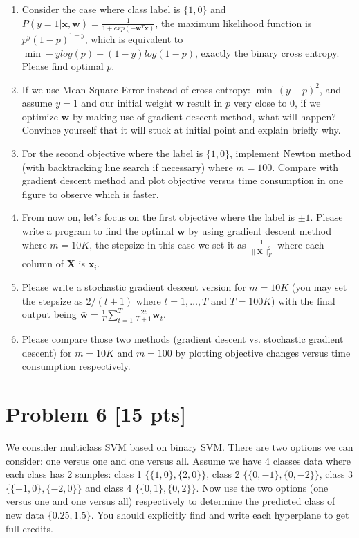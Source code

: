 \documentclass[11pt]{article}
\newcommand{\mtx}[1]{\mathbf{#1}}
\newcommand{\vct}[1]{\mathbf{#1}}
\def \mX {\mtx{X}}
\def \vw {\vct{w}}
\def \vx {\vct{x}}
\begin{document}
\begin{enumerate}
\begin{enumerate}
	\end{enumerate}
	\item Consider the case where class label is $\{1,0\}$ and $P(y=1|\vx,\vw)=\frac{1}{1+exp(-\vw^T\vx)}$, the maximum likelihood function is $p^y(1-p)^{1-y}$, which is equivalent to $\min -ylog(p)-(1-y)log(1-p)$, exactly the binary cross entropy. Please find optimal $p$.
	\item If we use Mean Square Error instead of cross entropy: $\min \ (y-p)^2$, and assume $y=1$ and our initial weight $\vw$ result in $p$ very close to 0, if we optimize $\vw$ by making use of gradient descent method, what will happen? Convince yourself that it will stuck at initial point and explain briefly why.
	\item For the second objective where the label is $\{1,0\}$, implement Newton method (with backtracking line search if necessary) where $m=100$.  Compare with gradient descent method and plot objective versus time consumption in one figure to observe which is faster.
	\item From now on, let's focus on the first objective where the label is $\pm1$. Please write a program to find the optimal  $\vw$ by using gradient descent method where $m=10K$, the stepsize in this case we set it as $\frac{1}{\|\mX\|_F^2}$ where each column of $\mX$ is $\vx_i$.
	\item Please write a stochastic gradient descent version for $m=10K$ (you may set the stepsize as $2/(t+1)$ where $t=1,\dots,T$ and $T=100K$) with the final output being $\bar{\vw}=\frac{1}{T}\sum_{t=1}^{T}\frac{2t}{T+1}\vw_t$.  
	\item Please compare those two methods (gradient descent vs. stochastic gradient descent) for $m=10K$ and $m=100$ by plotting objective changes versus time consumption respectively.
\end{enumerate}

\newpage
\section*{Problem 6 [15 pts]}
We consider multiclass SVM based on binary SVM. There are two options we can consider: one versus one and one versus all. Assume we have 4 classes data where each class has 2 samples: class 1 $\{\{1,0\},\{2,0\}\}$, class 2 $\{\{0,-1\},\{0,-2\}\}$, class 3 $\{\{-1,0\},\{-2,0\}\}$ and class 4 $\{\{0,1\},\{0,2\}\}$. Now use the two options (one versus one and one versus all) respectively to determine the predicted class of new data $\{0.25,1.5\}$. You should explicitly find and write each hyperplane to get full credits.
\end{document}
